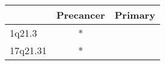 \begin{tabular}{lcc}
\toprule
{} & Precancer & Primary \\
\midrule
1q21.3   &         * &         \\
17q21.31 &         * &         \\
\bottomrule
\end{tabular}
